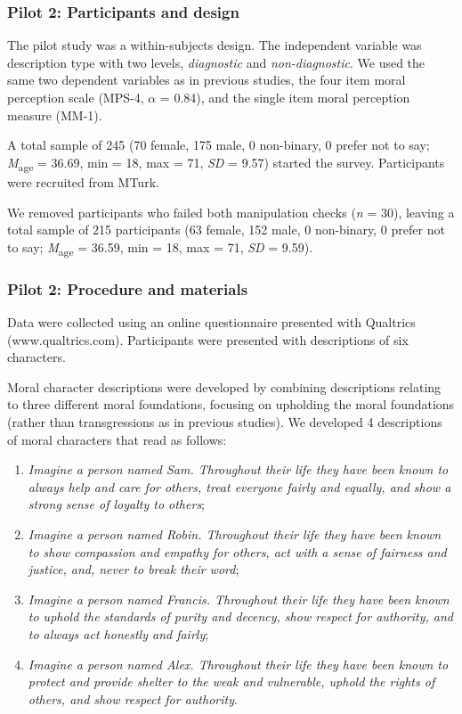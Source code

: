 \documentclass[
  man,floatsintext]{apa6}
\providecommand{\tightlist}{%
  \setlength{\itemsep}{0pt}\setlength{\parskip}{0pt}}
\begin{document}
\subsubsection{Pilot 2: Participants and design}\label{pilot-2-participants-and-design}

The pilot study was a within-subjects design. The independent variable was description type with two levels, \emph{diagnostic} and \emph{non-diagnostic}. We used the same two dependent variables as in previous studies, the four item moral perception scale (MPS-4, \(\alpha\) = 0.84), and the single item moral perception measure (MM-1).

A total sample of 245 (70 female, 175 male, 0 non-binary, 0 prefer not to say; \emph{M}\textsubscript{age} = 36.69, min = 18, max = 71, \emph{SD} = 9.57) started the survey. Participants were recruited from MTurk.

We removed participants who failed both manipulation checks (\emph{n} = 30), leaving a total sample of 215 participants (63 female, 152 male, 0 non-binary, 0 prefer not to say; \emph{M}\textsubscript{age} = 36.59, min = 18, max = 71, \emph{SD} = 9.59).

\subsubsection{Pilot 2: Procedure and materials}\label{pilot-2-procedure-and-materials}

Data were collected using an online questionnaire presented with Qualtrics (www.qualtrics.com). Participants were presented with descriptions of six characters.

Moral character descriptions were developed by combining descriptions relating to three different moral foundations, focusing on upholding the moral foundations (rather than transgressions as in previous studies). We developed 4 descriptions of moral characters that read as follows:

\begin{enumerate}
\def\labelenumi{(\roman{enumi})}
\tightlist
\item
  \emph{Imagine a person named Sam. Throughout their life they have been known to always help and care for others, treat everyone fairly and equally, and show a strong sense of loyalty to others};
\item
  \emph{Imagine a person named Robin. Throughout their life they have been known to show compassion and empathy for others, act with a sense of fairness and justice, and, never to break their word};
\item
  \emph{Imagine a person named Francis. Throughout their life they have been known to uphold the standards of purity and decency, show respect for authority, and to always act honestly and fairly};
\item
  \emph{Imagine a person named Alex. Throughout their life they have been known to protect and provide shelter to the weak and vulnerable, uphold the rights of others, and show respect for authority}.
\end{enumerate}
\end{document}
